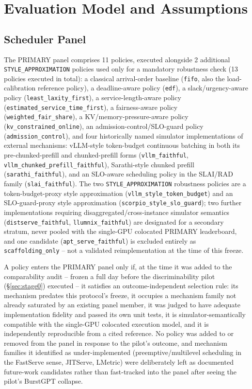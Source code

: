 \section{Evaluation Model and Assumptions}\label{sec:methodology}
\subsection{Scheduler Panel}
\label{sec:panel}

The PRIMARY panel comprises 11 policies, executed alongside 2 additional
\texttt{STYLE\_APPROXIMATION} policies used only for a mandatory robustness
check (13 policies executed in total): a classical arrival-order baseline
(\texttt{fifo}, also the load-calibration reference policy), a
deadline-aware policy (\texttt{edf}), a slack/urgency-aware policy
(\texttt{least\_laxity\_first}), a service-length-aware policy
(\texttt{estimated\_service\_time\_first}), a fairness-aware policy
(\texttt{weighted\_fair\_share}), a KV/memory-pressure-aware policy
(\texttt{kv\_constrained\_online}), an admission-control/SLO-guard policy
(\texttt{admission\_control}), and four historically named simulator implementations of
external mechanisms: vLLM-style token-budget continuous batching in both
its pre-chunked-prefill and chunked-prefill forms
(\texttt{vllm\_faithful}, \texttt{vllm\_chunked\_prefill\_faithful}),
Sarathi-style chunked prefill (\texttt{sarathi\_faithful}), and an
SLO-aware scheduling policy in the SLAI/RAD family
(\texttt{slai\_faithful}). The two \texttt{STYLE\_APPROXIMATION} robustness
policies are a token-budget-proxy style approximation
(\texttt{vllm\_style\_token\_budget}) and an SLO-guard-proxy style
approximation (\texttt{scorpio\_style\_slo\_guard}); two further implementations requiring disaggregated/cross-instance simulator
semantics (\texttt{distserve\_faithful}, \texttt{llumnix\_faithful}) are
designated for a secondary stratum, never pooled with the single-GPU
colocated PRIMARY leaderboard, and one candidate
(\texttt{apt\_serve\_faithful}) is excluded entirely as
\texttt{scaffolding\_only} -- not a validated reimplementation at the time
of this freeze.

A policy enters the PRIMARY panel only if, at the time it was added to the
comparability audit -- frozen a full day before the discriminability
pilot (\S\ref{sec:stage0}) executed -- it satisfies an outcome-independent
selection rule: its mechanism predates this protocol's freeze, it
occupies a mechanism family not already saturated by an existing panel
member, it was judged to have adequate implementation fidelity and passed its own unit
tests, it is simulator-semantically compatible with the single-GPU
colocated execution model, and it is independently reproducible from a
cited reference. No policy was added to or removed from the panel in
response to the pilot's outcome, and mechanism families it identified as
under-implemented (preemptive/multilevel scheduling in the FastServe
sense, JITServe, LMetric) were deliberately left as documented future-work
candidates rather than fast-tracked into the panel after seeing the
pilot's BurstGPT collapse.

